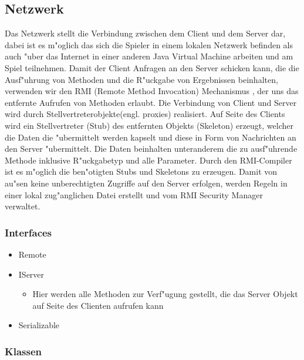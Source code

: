 \documentclass[a4paper,10pt]{article}
\begin{document}
\subsection{Netzwerk}
Das Netzwerk stellt die Verbindung zwischen dem Client und dem Server dar, dabei ist es m"oglich das sich die Spieler in einem lokalen
Netzwerk befinden als auch "uber das Internet in einer anderen Java Virtual Machine arbeiten und am Spiel teilnehmen. Damit der Client Anfragen an den Server schicken kann, die die Ausf"uhrung von Methoden und die R"uckgabe von Ergebnissen beinhalten, verwenden wir den RMI (Remote Method Invocation) Mechanismus , der uns das entfernte Aufrufen von Methoden erlaubt. Die Verbindung von Client und Server wird durch Stellvertreterobjekte(engl. proxies) realisiert. Auf Seite des Clients wird ein Stellvertreter (Stub) des entfernten Objekts (Skeleton) erzeugt, welcher die Daten die "ubermittelt werden kapselt und diese in Form von Nachrichten an den Server "ubermittelt. Die Daten beinhalten unteranderem die zu ausf"uhrende Methode inklusive R"uckgabetyp und alle Parameter. Durch den RMI-Compiler ist es m"oglich die ben"otigten Stubs und Skeletons zu erzeugen. Damit von au"sen keine unberechtigten Zugriffe auf den Server erfolgen, werden Regeln in einer lokal zug"anglichen Datei erstellt und vom RMI Security Manager verwaltet.    
  
\subsubsection{Interfaces}
\begin{itemize}
\item Remote
\item IServer
\begin{itemize}
\item Hier werden alle Methoden zur Verf"ugung gestellt, die das Server Objekt auf Seite des Clienten aufrufen kann
\end{itemize}
\item Serializable
\end{itemize}
\subsubsection{Klassen}
\end{document}
